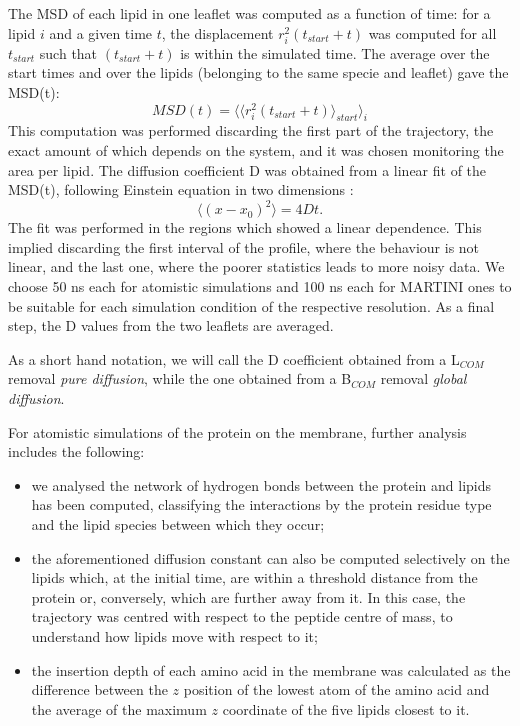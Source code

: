 \begin{itemize}
The MSD of each lipid in one leaflet was computed as a function of time: for a lipid $i$ and a given time $t$, the displacement $r_i^2(t_{start}+t)$ was computed for all $t_{start}$ such that $(t_{start}+t)$ is within the simulated time. The average over the start times and over the lipids (belonging to the same specie and leaflet) gave the MSD(t):
\begin{equation}
MSD(t) = \langle \langle r_i^2(t_{start}+t) \rangle_{start} \rangle_i
\end{equation}
This computation was performed discarding the first part of the trajectory, the exact amount of which depends on the system, and it was chosen monitoring the area per lipid.
The diffusion coefficient D was obtained from a linear fit of the MSD(t), following Einstein equation in two dimensions \citep{Einstein1956}:
\begin{equation}
\langle \left( x - x_0 \right)^2 \rangle = 4Dt.
\end{equation}
The fit was performed in the regions which showed a linear dependence. This implied discarding the first interval of the profile, where the behaviour is not linear, and the last one, where the poorer statistics leads to more noisy data. We choose 50 ns each for atomistic simulations and 100 ns each for MARTINI ones to be suitable for each simulation condition of the respective resolution. As a final step, the D values from the two leaflets are averaged.

As a short hand notation, we will call the D coefficient obtained from a L$_{COM}$ removal \emph{pure diffusion}, while the one obtained from a B$_{COM}$ removal \emph{global diffusion}.
\end{itemize}

For atomistic simulations of the protein on the membrane, further analysis includes the following:
\begin{itemize}
\item we analysed the network of hydrogen bonds between the protein and lipids has been computed, classifying the interactions by the protein residue type and the lipid species between which they occur;
\item the aforementioned diffusion constant can also be computed selectively on the lipids which, at the initial time, are within a threshold distance from the protein or, conversely, which are further away from it. In this case, the trajectory was centred with respect to the peptide centre of mass, to understand how lipids move with respect to it;
\item the insertion depth of each amino acid in the membrane was calculated as the difference between the $z$ position of the lowest atom of the amino acid and the average of the maximum $z$ coordinate of the five lipids closest to it.
\end{itemize}

